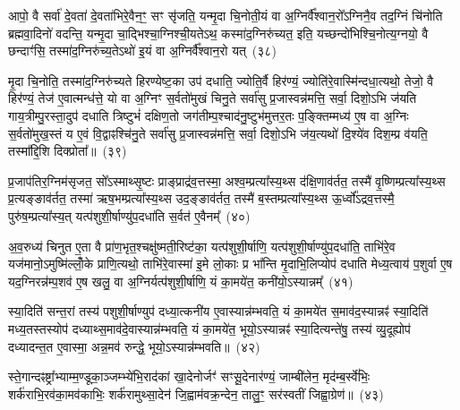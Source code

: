 आपो॒ वै सर्वा॑ दे॒वता॑ दे॒वता॑भिरे॒वैन॒ꣳ॒ सꣳ सृ॑जति॒ यन्मृ॒दा चि॒नोती॒यं वा अ॒ग्निर्वै᳚श्वान॒रो᳚\-ऽग्निनै॒व तद॒ग्निं चि॑नोति ब्रह्मवा॒दिनो॑ वदन्ति॒ यन्मृ॒दा चा॒द्भिश्चा॒ग्निश्ची॒यते\-ऽथ॒ कस्मा॑द॒ग्निरु॑च्यत॒ इति॒ यच्छन्दो॑भिश्चि॒नोत्य॒ग्नयो॒ वै छन्दाꣳ॑सि॒ तस्मा॑द॒ग्निरु॑च्य॒ते\-ऽथो॑ इ॒यं वा अ॒ग्निर्वै᳚श्वान॒रो यत्~(३८)

मृ॒दा चि॒नोति॒ तस्मा॑द॒ग्निरु॑च्यते हिरण्येष्ट॒का उप॑ दधाति॒ ज्योति॒र्वै हिर॑ण्यं॒ ज्योति॑रे॒वास्मि॑न्दधा॒त्यथो॒ तेजो॒ वै हिर॑ण्यं॒ तेज॑ ए॒वात्मन्ध॑त्ते॒ यो वा अ॒ग्निꣳ स॒र्वतो॑मुखं चिनु॒ते सर्वा॑सु प्र॒जास्वन्न॑मत्ति॒ सर्वा॒ दिशो॒\-ऽभि ज॑यति गाय॒त्रीम्पु॒रस्ता॒दुप॑ दधाति त्रिष्टुभं॑ दक्षिण॒तो जग॑तीम्प॒श्चाद॑नु॒ष्टुभ॑मुत्तर॒तः प॒ङ्क्तिम्मध्य॑ ए॒ष वा अ॒ग्निः स॒र्वतो॑मुख॒स्तं य ए॒वं वि॒द्वाꣴश्चि॑नु॒ते सर्वा॑सु प्र॒जास्वन्न॑मत्ति॒ सर्वा॒ दिशो॒\-ऽभि ज॑य॒त्यथो॑ दि॒श्ये॑व दिश॒म्प्र व॑यति॒ तस्मा᳚द्दि॒शि दिक्प्रोता᳚॥~(३९)

{\anuvakamend[{अपि॑ सं॒ यौति॑ वैश्वान॒रो यदे॒ष वै पञ्च॑विꣳशतिश्च}]}%

प्र॒जाप॑तिर॒ग्निम॑सृजत॒ सो᳚\-ऽस्माथ्सृ॒ष्टः प्राङ्प्राद्र॑व॒त्तस्मा॒ अश्व॒म्प्रत्या᳚स्य॒थ्स द॑क्षि॒णाव॑र्तत॒ तस्मै॑ वृ॒ष्णिम्प्रत्या᳚स्य॒थ्स प्र॒त्यङ्ङाव॑र्तत॒ तस्मा॑ ऋष॒भम्प्रत्या᳚स्य॒थ्स उद॒ङ्ङाव॑र्तत॒ तस्मै॑ ब॒स्तम्प्रत्या᳚स्य॒थ्स ऊ॒र्ध्वो᳚\-ऽद्रव॒त्तस्मै॒ पुरु॑ष॒म्प्रत्या᳚स्य॒त् यत्प॑शुशी॒र्\mbox{}षाण्यु॑प॒दधा॑ति स॒र्वत॑ ए॒वैनम्᳚~(४०)

अ॒व॒रुध्य॑ चिनुत ए॒ता वै प्रा॑ण॒भृत॒श्चक्षु॑ष्मती॒रिष्ट॑का॒ यत्प॑शुशी॒र्\mbox{}षाणि॒ यत्प॑शुशी॒र्\mbox{}षाण्यु॑प॒दधा॑ति॒ ताभि॑रे॒व यज॑मानो॒\-ऽमुष्मि॑ल्लोँ॒के प्राणि॒त्यथो॒ ताभि॑रे॒वास्मा॑ इ॒मे लो॒काः प्र भा᳚न्ति मृ॒दाभि॒लिप्योप॑ दधाति मेध्य॒त्वाय॑ प॒शुर्वा ए॒ष यद॒ग्निरन्न॑म्प॒शव॑ ए॒ष खलु॒ वा अ॒ग्निर्यत्प॑शुशी॒र्\mbox{}षाणि॒ यं का॒मये॑त॒ कनी॑यो॒\-ऽस्यान्नम्᳚~(४१)

स्या॒दिति॑ सन्त॒रां तस्य॑ पशुशी॒र्\mbox{}षाण्युप॑ दध्या॒त्कनी॑य ए॒वास्यान्न॑म्भवति॒ यं का॒मये॑त स॒माव॑द॒स्यान्नꣴ॑ स्या॒दिति॑ मध्य॒तस्तस्योप॑ दध्याथ्स॒माव॑दे॒वास्यान्न॑म्भवति॒ यं का॒मये॑त॒ भूयो॒\-ऽस्यान्नꣴ॑ स्या॒दित्यन्ते॑षु॒ तस्य॑ व्यु॒दूह्योप॑ दध्यादन्त॒त ए॒वास्मा॒ अन्न॒मव॑ रुन्द्धे॒ भूयो॒\-ऽस्यान्न॑म्भवति॥~(४२)

{\anuvakamend[{ए॒न॒म॒स्यान्न॒म्भूयो॒स्यान्न॑म्भवति}]}%

स्ते॒गान्दꣴष्ट्रा᳚भ्याम्म॒ण्डूका॒ञ्जम्भ्ये॑भि॒राद॑कां खा॒देनोर्जꣳ॑ सꣳसू॒देनार॑ण्यं॒ जाम्बी॑लेन॒ मृद॑म्ब॒र्स्वे॑भिः॒ शर्क॑राभि॒रव॑का॒मव॑काभिः॒ शर्क॑रामुथ्सा॒देन॑ जि॒ह्वाम॑वक्र॒न्देन॒ तालु॒ꣳ॒ सर॑स्वतीं जिह्वा॒ग्रेण॑॥~(४३)


